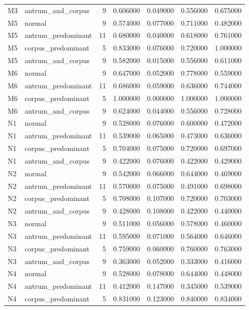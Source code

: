 \begin{table}
\begin{tabular}{llrrrrr}
M3 & antrum\_and\_corpus & 9 & 0.606000 & 0.049000 & 0.556000 & 0.675000 \\
M5 & normal & 9 & 0.574000 & 0.077000 & 0.711000 & 0.482000 \\
M5 & antrum\_predominant & 11 & 0.680000 & 0.040000 & 0.618000 & 0.761000 \\
M5 & corpus\_predominant & 5 & 0.833000 & 0.076000 & 0.720000 & 1.000000 \\
M5 & antrum\_and\_corpus & 9 & 0.582000 & 0.015000 & 0.556000 & 0.611000 \\
M6 & normal & 9 & 0.647000 & 0.052000 & 0.778000 & 0.559000 \\
M6 & antrum\_predominant & 11 & 0.686000 & 0.059000 & 0.636000 & 0.744000 \\
M6 & corpus\_predominant & 5 & 1.000000 & 0.000000 & 1.000000 & 1.000000 \\
M6 & antrum\_and\_corpus & 9 & 0.624000 & 0.044000 & 0.556000 & 0.728000 \\
N1 & normal & 9 & 0.528000 & 0.076000 & 0.600000 & 0.472000 \\
N1 & antrum\_predominant & 11 & 0.539000 & 0.065000 & 0.473000 & 0.636000 \\
N1 & corpus\_predominant & 5 & 0.704000 & 0.075000 & 0.720000 & 0.697000 \\
N1 & antrum\_and\_corpus & 9 & 0.422000 & 0.076000 & 0.422000 & 0.429000 \\
N2 & normal & 9 & 0.542000 & 0.066000 & 0.644000 & 0.469000 \\
N2 & antrum\_predominant & 11 & 0.570000 & 0.075000 & 0.491000 & 0.698000 \\
N2 & corpus\_predominant & 5 & 0.708000 & 0.107000 & 0.720000 & 0.703000 \\
N2 & antrum\_and\_corpus & 9 & 0.428000 & 0.108000 & 0.422000 & 0.440000 \\
N3 & normal & 9 & 0.511000 & 0.056000 & 0.578000 & 0.460000 \\
N3 & antrum\_predominant & 11 & 0.595000 & 0.071000 & 0.564000 & 0.646000 \\
N3 & corpus\_predominant & 5 & 0.759000 & 0.060000 & 0.760000 & 0.763000 \\
N3 & antrum\_and\_corpus & 9 & 0.363000 & 0.052000 & 0.333000 & 0.416000 \\
N4 & normal & 9 & 0.528000 & 0.078000 & 0.644000 & 0.448000 \\
N4 & antrum\_predominant & 11 & 0.412000 & 0.147000 & 0.345000 & 0.539000 \\
N4 & corpus\_predominant & 5 & 0.831000 & 0.123000 & 0.840000 & 0.834000 \\

\end{tabular}
\end{table}
